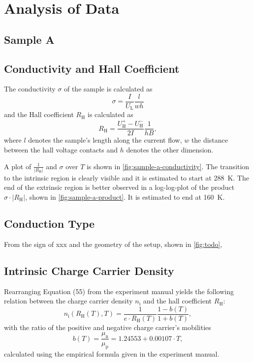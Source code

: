 \chapter{Analysis of Data}

\section{Sample A}

\section{Conductivity and Hall Coefficient}
The conductivity $\sigma$ of the sample is calculated as
\begin{equation*}
	\sigma = \frac{I}{U_\text{L}} \frac{l}{w h}
\end{equation*}
and the Hall coefficient $R_\text{H}$ is calculated as
\begin{equation*}
	R_\text{H} = \frac{U_\text{H}^+ - U_\text{H}^-}{2 I} \frac{1}{h B},
\end{equation*}
where $l$ denotes the sample's length along the current flow, $w$ the distance between the hall voltage contacts and $h$ denotes the other dimension.

A plot of $\frac{1}{\left|R_\text{H}\right|}$ and $\sigma$ over $T$ is shown in \autoref{fig:sample-a-conductivity}.
The transition to the intrinsic region is clearly visible and it is estimated to start at \SI{288}{\kelvin}.
The end of the extrinsic region is better observed in a log-log-plot of the product $\sigma \cdot \left| R_\text{H} \right|$, shown in \autoref{fig:sample-a-product}.
It is estimated to end at \SI{160}{\kelvin}.

\section{Conduction Type}
From the sign of xxx and the geometry of the setup, shown in \autoref{fig:todo}, \todo{}

\section{Intrinsic Charge Carrier Density}
Rearranging Equation (55) from the experiment manual yields the following relation between the charge carrier density $n_\text{i}$ and the hall coefficient $R_\text{H}$:
\begin{equation*}
	n_\text{i} \left(R_\text{H}\left( T \right), T \right) = \frac{1}{e \cdot R_\text{H}\left(T\right)} \frac{ 1 - b \left( T \right) }{ 1 + b \left( T \right) },
\end{equation*}
with the ratio of the positive and negative charge carrier's mobilities
\begin{equation*}
	b \left( T \right) = \frac{\mu_\text{n}}{\mu_\text{p}} = \num{1.24553} + \num{0.00107} \cdot T,
\end{equation*}
calculated using the empirical formula given in the experiment manual.


